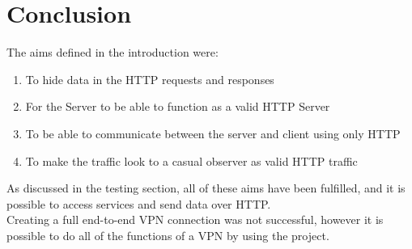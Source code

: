 \section{Conclusion}
The aims defined in the introduction were:
\begin{enumerate}
    \item To hide data in the HTTP requests and responses
    \item For the Server to be able to function as a valid HTTP Server
    \item To be able to communicate between the server and client using only HTTP
    \item To make the traffic look to a casual observer as valid HTTP traffic
\end{enumerate}
As discussed in the testing section, all of these aims have been fulfilled, and it is possible to access services and send data over HTTP.\\
Creating a full end-to-end VPN connection was not successful, however it is possible to do all of the functions of a VPN by using the project.
